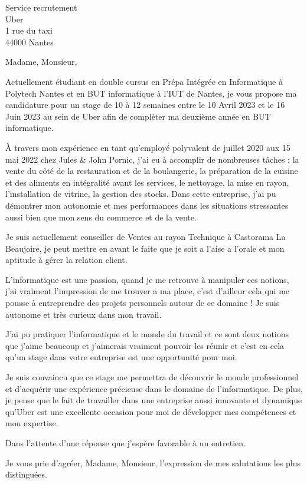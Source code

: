 \documentclass[
    french,
    sender,
    paper=a4,
    version=last,
    fontsize=9pt,
    DIV=12,
    BCOR=0mm
]{scrlttr2}
\begin{document}




\begin{letter}{
    Service recrutement\\
    Uber\\
    1 rue du taxi\\
    44000 Nantes
}

\opening{Madame, Monsieur,}


Actuellement étudiant en double cursus en Prépa Intégrée en Informatique à Polytech Nantes et en BUT informatique à l’IUT de Nantes, je vous propose ma candidature pour un stage de 10 à 12 semaines entre le 10 Avril 2023 et le 16 Juin 2023 au sein de Uber afin de compléter ma deuxième année en BUT informatique. 

À travers mon expérience en tant qu’employé polyvalent de juillet 2020 aux 15 mai 2022 chez Jules \& John Pornic, j’ai eu à accomplir de nombreuses tâches : la vente du côté de la restauration et de la boulangerie, la préparation de la cuisine et des aliments en intégralité avant les services, le nettoyage, la mise en rayon, l’installation de vitrine, la gestion des stocks. Dans cette entreprise, j’ai pu démontrer mon autonomie et mes performances dans les situations stressantes aussi bien que mon sens du commerce et de la vente.

Je suis actuellement conseiller de Ventes au rayon Technique à Castorama La Beaujoire, je peut mettre en avant le faite que je soit a l'aise a l'orale et mon aptitude à gérer la relation client.

L’informatique est une passion, quand je me retrouve à manipuler ces notions, j’ai vraiment l'impression de me trouver a ma place, c’est d’ailleur cela qui me pousse à entreprendre des projets personnels autour de ce domaine ! Je suis autonome et très curieux  dans mon travail.

J’ai pu pratiquer l’informatique et le monde du travail et ce sont deux notions que j’aime beaucoup et j’aimerais vraiment pouvoir les réunir et c’est en cela qu’un stage dans votre entreprise est une opportunité pour moi.

Je suis convaincu que ce stage me permettra de découvrir le monde professionnel et d'acquérir une expérience précieuse dans le domaine de l'informatique. De plus, je pense que le fait de travailler dans une entreprise aussi innovante et dynamique qu'Uber est une excellente occasion pour moi de développer mes compétences et mon expertise.

Dans l’attente d’une réponse que j'espère favorable à un entretien.

\closing{Je vous prie d’agréer, Madame, Monsieur, l’expression de mes salutations les plus distinguées.\\}

\end{letter}
\end{document}
